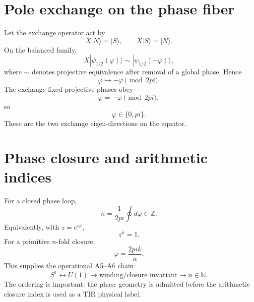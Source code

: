 \documentclass[11pt,a4paper,twoside]{book}
\def\pi{pi}%
\theoremstyle{definition}
\begin{document}
\section{Pole exchange on the phase fiber}

Let the exchange operator act by
\begin{equation}
X|N\rangle=|S\rangle,
\qquad
X|S\rangle=|N\rangle.
\end{equation}
On the balanced family,
\begin{equation}
X|\psi_{1/2}(\varphi)\rangle
\sim
|\psi_{1/2}(-\varphi)\rangle,
\end{equation}
where $\sim$ denotes projective equivalence after removal of a global phase. Hence
\begin{equation}
\boxed{\varphi\mapsto-\varphi\pmod{2\pi}.}
\label{eq:v12_half_phase_exchange}
\end{equation}
The exchange-fixed projective phases obey
\begin{equation}
\varphi=-\varphi\pmod{2\pi},
\end{equation}
so
\begin{equation}
\boxed{\varphi\in\{0,\pi\}.}
\label{eq:v12_half_fixed_phases}
\end{equation}
These are the two exchange eigen-directions on the equator.

\section{Phase closure and arithmetic indices}

For a closed phase loop,
\begin{equation}
\boxed{
n=\frac1{2\pi}\oint d\varphi\in\mathbb Z.
}
\label{eq:v12_winding}
\end{equation}
Equivalently, with $z=e^{i\varphi}$,
\begin{equation}
z^n=1.
\end{equation}
For a primitive $n$-fold closure,
\begin{equation}
\varphi=\frac{2\pi k}{n}.
\end{equation}
This supplies the operational A5--A6 chain
\begin{equation}
\boxed{
S^1
\longleftrightarrow
U(1)
\longrightarrow
\text{winding/closure invariant}
\longrightarrow
n\in\mathbb N.
}
\end{equation}
The ordering is important: the phase geometry is admitted before the arithmetic closure index is used as a TIR physical label.
\end{document}
